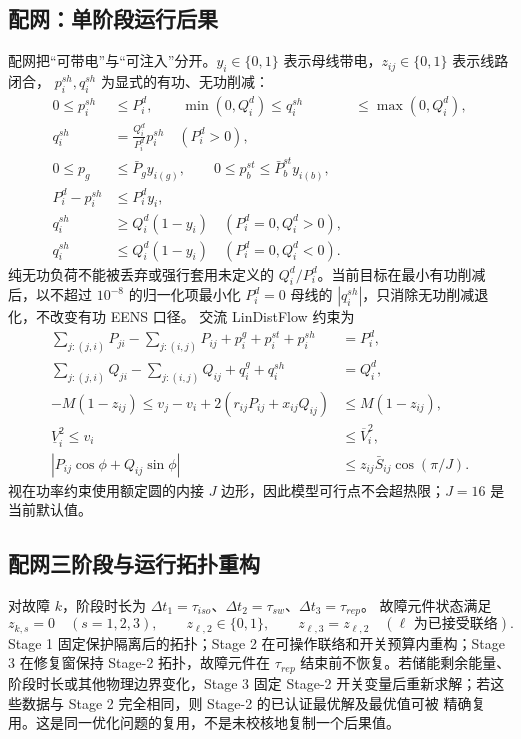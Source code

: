 \subsection{配网：单阶段运行后果}
配网把“可带电”与“可注入”分开。$y_i\in\{0,1\}$ 表示母线带电，$z_{ij}\in\{0,1\}$ 表示线路闭合，
$p_i^{sh},q_i^{sh}$ 为显式的有功、无功削减：
\begin{align}
 0\le p_i^{sh}&\le P_i^d,\qquad
 \min(0,Q_i^d)\le q_i^{sh}&\le\max(0,Q_i^d),\\
 q_i^{sh}&=\frac{Q_i^d}{P_i^d}p_i^{sh}\quad(P_i^d>0),\\
 0\le p_g&\le \bar P_g y_{i(g)},\qquad
 0\le p_b^{st}\le\bar P_b^{st}y_{i(b)},\\
 P_i^d-p_i^{sh}&\le P_i^d y_i,\\
 q_i^{sh}&\ge Q_i^d(1-y_i)\quad(P_i^d=0,Q_i^d>0),\\
 q_i^{sh}&\le Q_i^d(1-y_i)\quad(P_i^d=0,Q_i^d<0).
 \end{align}
纯无功负荷不能被丢弃或强行套用未定义的 $Q_i^d/P_i^d$。当前目标在最小有功削减后，以不超过
$10^{-8}$ 的归一化项最小化 $P_i^d=0$ 母线的 $|q_i^{sh}|$，只消除无功削减退化，不改变有功 EENS 口径。
交流 LinDistFlow 约束为
\begin{align}
 \sum_{j:(j,i)}P_{ji}-\sum_{j:(i,j)}P_{ij}+p_i^g+p_i^{st}+p_i^{sh}&=P_i^d,\\
 \sum_{j:(j,i)}Q_{ji}-\sum_{j:(i,j)}Q_{ij}+q_i^g+q_i^{sh}&=Q_i^d,\\
 -M(1-z_{ij})\le v_j-v_i+2(r_{ij}P_{ij}+x_{ij}Q_{ij})&\le M(1-z_{ij}),\\
 \underline V_i^2\le v_i&\le\overline V_i^2,\\
 |P_{ij}\cos\phi+Q_{ij}\sin\phi|&\le z_{ij}\bar S_{ij}\cos(\pi/J).
 \end{align}
视在功率约束使用额定圆的内接 $J$ 边形，因此模型可行点不会超热限；$J=16$ 是当前默认值。

\subsection{配网三阶段与运行拓扑重构}
对故障 $k$，阶段时长为 $\Delta t_1=\tau_{iso}$、$\Delta t_2=\tau_{sw}$、$\Delta t_3=\tau_{rep}$。
故障元件状态满足
\begin{equation}
 z_{k,s}=0\quad(s=1,2,3),\qquad z_{\ell,2}\in\{0,1\},
 \qquad z_{\ell,3}=z_{\ell,2}\quad(\ell\text{ 为已接受联络}).
 \label{eq:physical-three-stage-topology}
\end{equation}
Stage 1 固定保护隔离后的拓扑；Stage 2 在可操作联络和开关预算内重构；Stage 3 在修复窗保持 Stage-2
拓扑，故障元件在 $\tau_{rep}$ 结束前不恢复。若储能剩余能量、阶段时长或其他物理边界变化，Stage 3
固定 Stage-2 开关变量后重新求解；若这些数据与 Stage 2 完全相同，则 Stage-2 的已认证最优解及最优值可被
精确复用。这是同一优化问题的复用，不是未校核地复制一个后果值。

